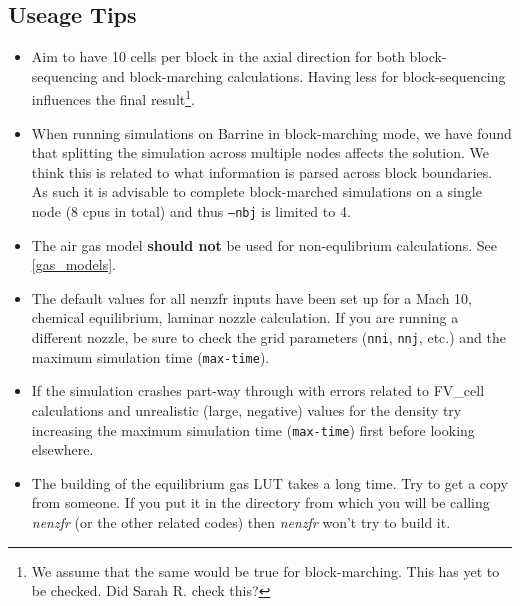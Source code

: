\subsection{Useage Tips}
\begin{itemize}
\item Aim to have 10 cells per block in the axial direction for both block-sequencing and block-marching calculations. Having less for block-sequencing influences the final result\footnote{We assume that the same would be true for block-marching. This has yet to be checked. Did Sarah R. check this?}. 
\item When running simulations on Barrine in block-marching mode, we have found that splitting the simulation across multiple nodes affects the solution. We think this is related to what information is parsed across block boundaries. As such it is advisable to complete block-marched simulations on a single node (8 cpus in total) and thus \texttt{--nbj} is limited to 4.
\item The air gas model \textbf{should not} be used for non-equlibrium calculations. See \cref{gas_models}.
\item The default values for all nenzfr inputs have been set up for a Mach 10, chemical equilibrium, laminar nozzle calculation. If you are running a different nozzle, be sure to check the grid parameters (\texttt{nni}, \texttt{nnj},  etc.) and the maximum simulation time (\texttt{max-time}).
\item If the simulation crashes part-way through with errors related to FV\_cell calculations and unrealistic (large, negative) values for the density try increasing the maximum simulation time (\texttt{max-time}) first before looking elsewhere. 
\item The building of the equilibrium gas LUT takes a long time. Try to get a copy from someone. If you put it in the directory from which you will be calling \textit{nenzfr} (or the other related codes) then \textit{nenzfr} won't try to build it.
\end{itemize}

